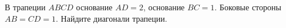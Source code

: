 \begin{ex}
	\begin{condition}
		В трапеции \( ABCD  \) основание \( AD = 2 \), основание \( BC = 1 \). Боковые стороны \( AB = CD = 1 \). Найдите диагонали трапеции.
	\end{condition}
\end{ex}
